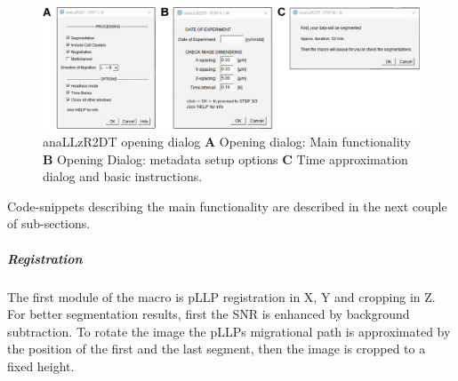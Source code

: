 \documentclass[10pt, b5paper, singlespacinge, twoside]{reedthesis} %
\theoremstyle{definition}
\theoremstyle{definition}
\theoremstyle{definition}
\theoremstyle{remark}
\begin{document}
\begin{figure}[H]

{\centering \includegraphics[width=0.95\linewidth]{figures/materials/macros/anallzr2DT_macro} 

}

\caption[anaLLzR2DT opening dialog]{anaLLzR2DT opening dialog \textbf{A} Opening dialog: Main functionality \textbf{B} Opening Dialog: metadata setup options \textbf{C} Time approximation dialog and basic instructions.}\label{fig:anallzr2dtdialog}
\end{figure}
Code-snippets describing the main functionality are described in the next couple of sub-sections.

\hypertarget{registration}{%
\subparagraph{Registration}\label{registration}}

The first module of the macro is pLLP registration in X, Y and cropping in Z. For better segmentation results, first the SNR is enhanced by background subtraction. To rotate the image the pLLPs migrational path is approximated by the position of the first and the last segment, then the image is cropped to a fixed height.
\end{document}
